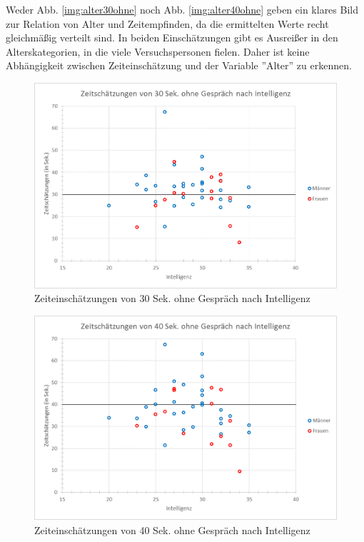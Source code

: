 \documentclass{Paper}
\begin{document}
Weder Abb. \ref{img:alter30ohne} noch Abb. \ref{img:alter40ohne} geben ein klares Bild zur Relation von Alter und Zeitempfinden, da die ermittelten Werte recht gleichmäßig verteilt sind. In beiden Einschätzungen gibt es Ausreißer in den Alterskategorien, in die viele Versuchspersonen fielen. Daher ist keine Abhängigkeit zwischen Zeiteinschätzung und der Variable ''Alter'' zu erkennen. %



\begin{figure}[H]
	\centering
	\includegraphics[scale=0.7]{../Diagramme/scatterPre/30ohne_intelligenz.png}
	\caption{Zeiteinschätzungen von 30 Sek. ohne Gespräch nach Intelligenz}
	\label{img:intell30ohne}
\end{figure}
\begin{figure}[H]
	\centering
	\includegraphics[scale=0.7]{../Diagramme/scatterPre/40ohne_intelligenz.png}
	\caption{Zeiteinschätzungen von 40 Sek. ohne Gespräch nach Intelligenz}
	\label{img:intell40ohne}
\end{figure}
\end{document}

